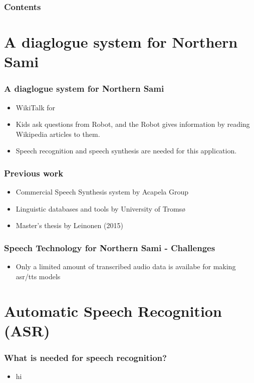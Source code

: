 \begin{frame}
\frametitle{Contents}
\tableofcontents
\end{frame}





\section{A diaglogue system for Northern Sami}
\begin{frame}
\frametitle{A diaglogue system for Northern Sami}
\begin{itemize}
\item WikiTalk for \ns
\item Kids ask questions from Robot, and the Robot gives information by reading Wikipedia articles to them.
\item Speech recognition and speech synthesis are needed for this application.
\end{itemize}
\end{frame}

\begin{frame}
\frametitle{Previous work}
\begin{itemize}
\item Commercial Speech Synthesis system by Acapela Group\\
\item Linguistic databases and tools by University of Tromsø\\[1cm]
\item Master's thesis by Leinonen (2015)\\
\end{itemize}
\end{frame}

\begin{frame}
\frametitle{Speech Technology for Northern Sami - Challenges}
\begin{itemize}
\item Only a limited amount of transcribed audio data is availabe for making asr/tts models
\end{itemize}
\end{frame}



\section[Speech Recognition]{Automatic Speech Recognition (ASR)}
\begin{frame}
\frametitle{What is needed for speech recognition?}
\begin{itemize}
\item hi
\end{itemize}
\end{frame}

